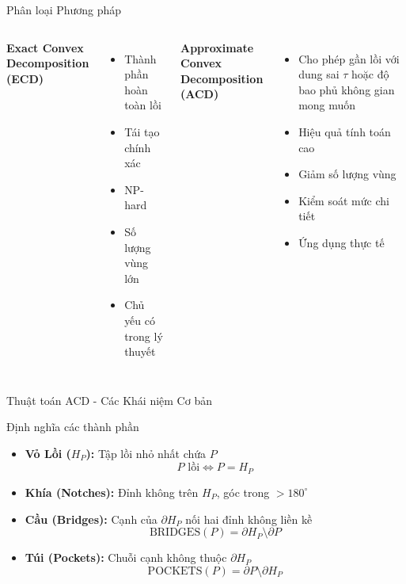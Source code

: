 \documentclass[aspectratio=169]{beamer}
\begin{document}
\begin{frame}{Phân loại Phương pháp}
    \begin{columns}[T]
        \textbf{Exact Convex Decomposition (ECD)}
        \begin{itemize}
            \item Thành phần hoàn toàn lồi
            \item Tái tạo chính xác
            \item NP-hard
            \item Số lượng vùng lớn
            \item Chủ yếu có trong lý thuyết
        \end{itemize}

        \textbf{Approximate Convex Decomposition (ACD)}
        \begin{itemize}
            \item Cho phép gần lồi với dung sai $\tau$ hoặc độ bao phủ không gian mong muốn
            \item Hiệu quả tính toán cao
            \item Giảm số lượng vùng
            \item Kiểm soát mức chi tiết
            \item Ứng dụng thực tế
        \end{itemize}
    \end{columns}
\end{frame}


\begin{frame}{Thuật toán ACD - Các Khái niệm Cơ bản}

    \begin{block}{Định nghĩa các thành phần}
        \begin{itemize}
            \item \textbf{Vỏ Lồi ($H_P$):} Tập lồi nhỏ nhất chứa $P$
                  \[
                      P \text{ lồi} \Leftrightarrow P = H_P
                  \]

            \item \textbf{Khía (Notches):} Đỉnh không trên $H_P$, góc trong $> 180^\circ$

            \item \textbf{Cầu (Bridges):} Cạnh của $\partial H_P$ nối hai đỉnh không liền kề
                  \[
                      \text{BRIDGES}(P) = \partial H_P \setminus \partial P
                  \]

            \item \textbf{Túi (Pockets):} Chuỗi cạnh không thuộc $\partial H_P$
                  \[
                      \text{POCKETS}(P) = \partial P \setminus \partial H_P
                  \]
        \end{itemize}
    \end{block}

\end{frame}
\end{document}
